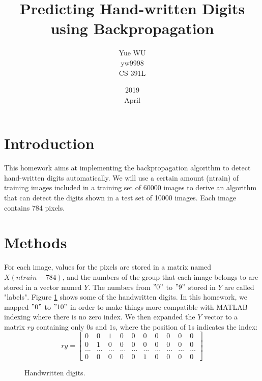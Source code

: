 \documentclass[UTF8,12pt]{article}
\title{Predicting Hand-written Digits using Backpropagation}
\date{2019\\ April}
\author{Yue WU\\ yw9998\\CS 391L}
\begin{document}
	\maketitle
	\section{Introduction}
	This homework aims at implementing the backpropagation algorithm to detect hand-written digits automatically. We will use a certain amount (ntrain) of training images included in a training set of 60000 images to derive an algorithm that can detect the digits shown in a test set of 10000 images. Each image contains 784 pixels.
	\section{Methods}
	For each image, values for the pixels are stored in a matrix named $X (ntrain - 784)$, and the numbers of the group that each image belongs to are stored in a vector named $Y$. The numbers from $"0"$ to $"9"$ stored in $Y$ are called "labels". Figure \ref{fig:1_visualization} shows some of the handwritten digits. In this homework, we mapped $"0"$ to $"10"$ in order to make things more compatible with MATLAB indexing where there is no zero index. We then expanded the $Y$ vector to a matrix $ry$ containing only $0$s and $1$s, where the position of $1$s indicates the index:
	\begin{equation}
		ry = \begin{bmatrix}
			0 & 0 & 1 & 0 & 0 & 0 & 0 & 0 & 0 & 0\\ 
			0 & 1 & 0 & 0 & 0 & 0 & 0 & 0 & 0 & 0\\ 
			... & ... & ... & ... & ... & ... & ... & ... & ... & ...\\ 
			0 & 0 & 0 & 0 & 0 & 1 & 0 & 0 & 0 & 0
		\end{bmatrix}
	\end{equation}
	\begin{figure}[!ht]
		\centering
		\caption{\label{fig:1_visualization}Handwritten digits.}
	\end{figure}
	
\end{document}
